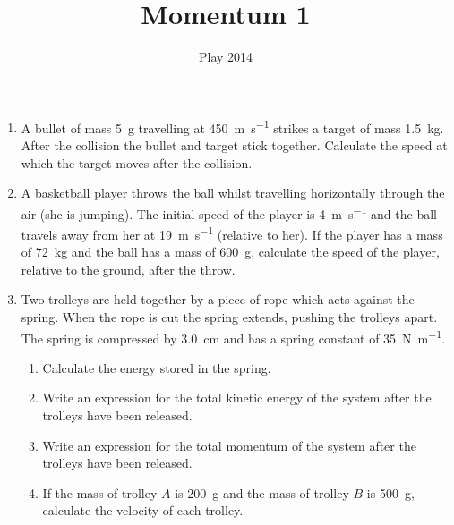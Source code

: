 \documentclass{article}
\title{Momentum 1}
\date{Play 2014}
\begin{document}
\maketitle\thispagestyle{empty}
\begin{enumerate}
    \item A bullet of mass \SI{5}{\gram} travelling at \SI{450}{\metre\per\second} strikes a target of mass \SI{1.5}{\kilogram}. After the collision the bullet and target stick together. Calculate the speed at which the target moves after the collision.
    \item A basketball player throws the ball whilst travelling horizontally through the air (she is jumping). The initial speed of the player is \SI{4}{\metre\per\second} and the ball travels away from her at \SI{19}{\metre\per\second} (relative to her). If the player has a mass of \SI{72}{\kilogram} and the ball has a mass of \SI{600}{\gram}, calculate the speed of the player, relative to the ground, after the throw.
    \item Two trolleys are held together by a piece of rope which acts against the spring. When the rope is cut the spring extends, pushing the trolleys apart. The spring is compressed by \SI{3.0}{\cm} and has a spring constant of \SI{35}{\newton\per\metre}. 
        \begin{enumerate}
            \item Calculate the energy stored in the spring.
            \item Write an expression for the total kinetic energy of the system after the trolleys have been released.
            \item Write an expression for the total momentum of the system after the trolleys have been released.
            \item If the mass of trolley $A$ is \SI{200}{\gram} and the mass of trolley $B$ is \SI{500}{\gram}, calculate the velocity of each trolley.
        \end{enumerate}
\end{enumerate}
\end{document}
